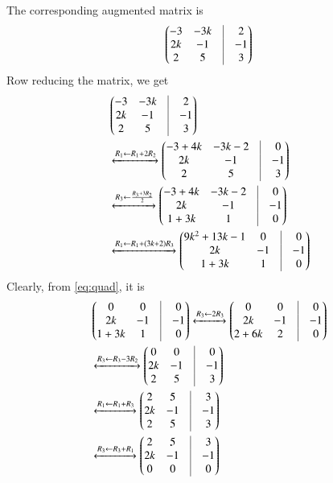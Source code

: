 \documentclass[journal,12pt,twocolumn]{IEEEtran}
\begin{document}
The corresponding augmented matrix is 
\begin{align}
    \myvec{-3 & -3k & \vrule & 2\\
    2k & -1 & \vrule & -1\\
    2 &  5 & \vrule & 3}
\end{align}
Row reducing the matrix, we get
\begin{align}
    &\myvec{-3 & -3k & \vrule & 2\\
    2k & -1 & \vrule & -1\\
    2 &  5 & \vrule & 3}\\&\xleftrightarrow{R_1\leftarrow R_{1}+2R_{2}}\myvec{-3+4k & -3k-2 & \vrule & 0\\
    2k & -1 & \vrule & -1\\
    2 &  5 & \vrule & 3}\\
    &\xleftrightarrow{R_3\leftarrow \frac{R_{3}+3R_{2}}{2}}\myvec{-3+4k & -3k-2 & \vrule & 0\\
    2k & -1 & \vrule & -1\\
    1+3k &  1 & \vrule & 0}\\
    &\xleftrightarrow{R_1\leftarrow R_1+(3k+2)R_3}\myvec{9k^2+13k-1& 0 & \vrule & 0\\
    2k & -1 & \vrule & -1\\
    1+3k &  1 & \vrule & 0}
\end{align}
Clearly, from \eqref{eq:quad}, it is
\begin{align}
    &\myvec{0 & 0 & \vrule & 0\\
    2k & -1 & \vrule & -1\\
    1+3k &  1 & \vrule & 0}\xleftrightarrow{R_3\leftarrow2R_3}\myvec{0 & 0 & \vrule & 0\\
    2k & -1 & \vrule & -1\\
    2+6k &  2 & \vrule & 0}\\&\xleftrightarrow{R_3\leftarrow R_3-3R_2}\myvec{0 & 0 & \vrule & 0\\
    2k & -1 & \vrule & -1\\
    2 &  5 & \vrule & 3}\\&\xleftrightarrow{R_1\leftarrow R_1+R_3}\myvec{2 & 5 & \vrule & 3\\
    2k & -1 & \vrule & -1\\
    2 &  5 & \vrule & 3}\\&\xleftrightarrow{R_3\leftarrow R_3+R_1}\myvec{2 & 5 & \vrule & 3\\
    2k & -1 & \vrule & -1\\
    0 &  0 & \vrule & 0}
\end{align}
\end{document}
